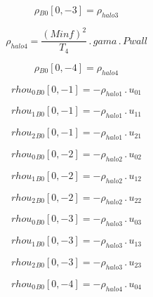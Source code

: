 \documentclass{article}
\begin{document}
\begin{dmath}{\rho{_{B0}}}[{0,-3}] = \rho_{halo 3}\end{dmath}

\begin{dmath}\rho_{halo 4} = \frac{\left(Minf \right)^{2}}{T_{4}} \,.\, gama \,.\, Pwall\end{dmath}

\begin{dmath}{\rho{_{B0}}}[{0,-4}] = \rho_{halo 4}\end{dmath}

\begin{dmath}{rhou_{0}{_{B0}}}[{0,-1}] = - \rho_{halo 1} \,.\, u_{01}\end{dmath}

\begin{dmath}{rhou_{1}{_{B0}}}[{0,-1}] = - \rho_{halo 1} \,.\, u_{11}\end{dmath}

\begin{dmath}{rhou_{2}{_{B0}}}[{0,-1}] = - \rho_{halo 1} \,.\, u_{21}\end{dmath}

\begin{dmath}{rhou_{0}{_{B0}}}[{0,-2}] = - \rho_{halo 2} \,.\, u_{02}\end{dmath}

\begin{dmath}{rhou_{1}{_{B0}}}[{0,-2}] = - \rho_{halo 2} \,.\, u_{12}\end{dmath}

\begin{dmath}{rhou_{2}{_{B0}}}[{0,-2}] = - \rho_{halo 2} \,.\, u_{22}\end{dmath}

\begin{dmath}{rhou_{0}{_{B0}}}[{0,-3}] = - \rho_{halo 3} \,.\, u_{03}\end{dmath}

\begin{dmath}{rhou_{1}{_{B0}}}[{0,-3}] = - \rho_{halo 3} \,.\, u_{13}\end{dmath}

\begin{dmath}{rhou_{2}{_{B0}}}[{0,-3}] = - \rho_{halo 3} \,.\, u_{23}\end{dmath}

\begin{dmath}{rhou_{0}{_{B0}}}[{0,-4}] = - \rho_{halo 4} \,.\, u_{04}\end{dmath}
\end{document}
